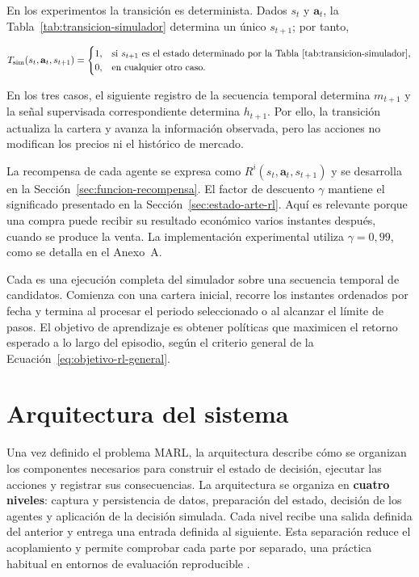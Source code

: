 En los experimentos la transición es determinista. Dados $s_t$ y $\mathbf{a}_t$, la Tabla~\ref{tab:transicion-simulador} determina un único $s_{t+1}$; por tanto,

\begin{equation}
T_{\mathrm{sim}}(s_t,\mathbf{a}_t,s_{t+1})=
\begin{cases}
1, & \text{si } s_{t+1} \text{ es el estado determinado por la Tabla~\ref{tab:transicion-simulador}},\\
0, & \text{en cualquier otro caso}.
\end{cases}
\label{eq:transicion-determinista-cs2}
\end{equation}

En los tres casos, el siguiente registro de la secuencia temporal determina $m_{t+1}$ y la señal supervisada correspondiente determina $h_{t+1}$. Por ello, la transición actualiza la cartera y avanza la información observada, pero las acciones no modifican los precios ni el histórico de mercado.

La recompensa de cada agente se expresa como $R^i(s_t,\mathbf{a}_t,s_{t+1})$ y se desarrolla en la Sección~\ref{sec:funcion-recompensa}. El factor de descuento $\gamma$ mantiene el significado presentado en la Sección~\ref{sec:estado-arte-rl}. Aquí es relevante porque una compra puede recibir su resultado económico varios instantes después, cuando se produce la venta. La implementación experimental utiliza $\gamma=0{,}99$, como se detalla en el Anexo~A.

Cada \textbf{} es una ejecución completa del simulador sobre una secuencia temporal de candidatos. Comienza con una cartera inicial, recorre los instantes ordenados por fecha y termina al procesar el periodo seleccionado o al alcanzar el límite de pasos. El objetivo de aprendizaje es obtener políticas que maximicen el retorno esperado a lo largo del episodio, según el criterio general de la Ecuación~\ref{eq:objetivo-rl-general}.

\section{Arquitectura del sistema}
\label{sec:arquitectura-sistema}

Una vez definido el problema MARL, la arquitectura describe cómo se organizan los componentes necesarios para construir el estado de decisión, ejecutar las acciones y registrar sus consecuencias. La arquitectura se organiza en \textbf{cuatro niveles}: captura y persistencia de datos, preparación del estado, decisión de los agentes y aplicación de la decisión simulada. Cada nivel recibe una salida definida del anterior y entrega una entrada definida al siguiente. Esta separación reduce el acoplamiento y permite comprobar cada parte por separado, una práctica habitual en entornos de evaluación reproducible \cite{liu2021finrl,pineau2021reproducibility}.

